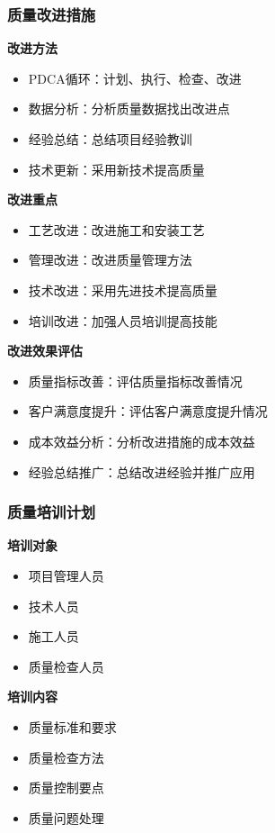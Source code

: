\documentclass[UTF8,a4paper,12pt]{article}
\begin{document}
\subsubsection{质量改进措施}
\textbf{改进方法}
\begin{itemize}
    \item PDCA循环：计划、执行、检查、改进
    \item 数据分析：分析质量数据找出改进点
    \item 经验总结：总结项目经验教训
    \item 技术更新：采用新技术提高质量
\end{itemize}

\textbf{改进重点}
\begin{itemize}
    \item 工艺改进：改进施工和安装工艺
    \item 管理改进：改进质量管理方法
    \item 技术改进：采用先进技术提高质量
    \item 培训改进：加强人员培训提高技能
\end{itemize}

\textbf{改进效果评估}
\begin{itemize}
    \item 质量指标改善：评估质量指标改善情况
    \item 客户满意度提升：评估客户满意度提升情况
    \item 成本效益分析：分析改进措施的成本效益
    \item 经验总结推广：总结改进经验并推广应用
\end{itemize}

\subsubsection{质量培训计划}
\textbf{培训对象}
\begin{itemize}
    \item 项目管理人员
    \item 技术人员
    \item 施工人员
    \item 质量检查人员
\end{itemize}

\textbf{培训内容}
\begin{itemize}
    \item 质量标准和要求
    \item 质量检查方法
    \item 质量控制要点
    \item 质量问题处理
\end{itemize}
\end{document}
